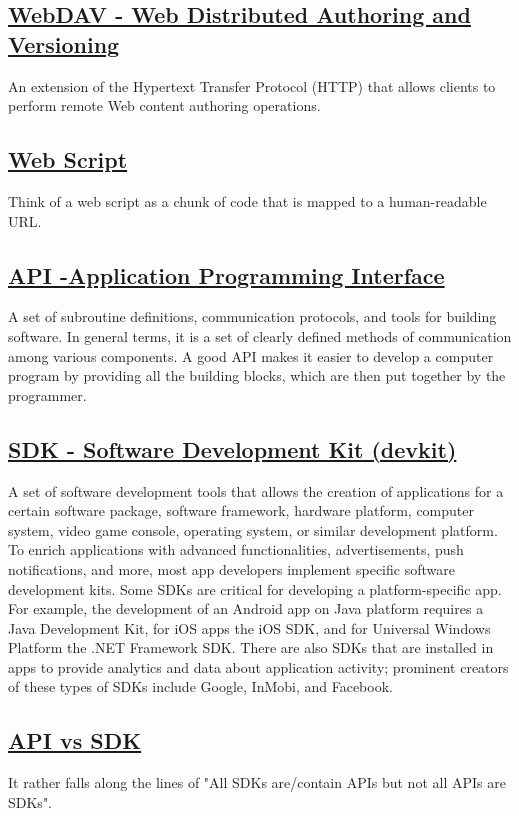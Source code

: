 \documentclass[11pt]{article}
\begin{document}
\subsection{\href{https://en.wikipedia.org/wiki/WebDAV}{WebDAV - Web Distributed Authoring and Versioning}}
\label{sec:org3872fe8}
An extension of the Hypertext Transfer Protocol (HTTP) that allows clients to perform remote Web content authoring operations.
\subsection{\href{https://ecmarchitect.com/alfresco-developer-series-tutorials/webscripts/tutorial/tutorial.html}{Web Script}}
\label{sec:orgc455295}
Think of a web script as a chunk of code that is mapped to a human-readable URL.
\subsection{\href{https://en.wikipedia.org/wiki/Application\_programming\_interface}{API -Application Programming Interface}}
\label{sec:org3449a94}
A set of subroutine definitions, communication protocols, and tools for building software. In general terms, it is a set of clearly defined methods of communication among various components. A good API makes it easier to develop a computer program by providing all the building blocks, which are then put together by the programmer.
\subsection{\href{https://en.wikipedia.org/wiki/Software\_development\_kit}{SDK - Software Development Kit (devkit)}}
\label{sec:org4bf56a3}
A set of software development tools that allows the creation of applications for a certain software package, software framework, hardware platform, computer system, video game console, operating system, or similar development platform. To enrich applications with advanced functionalities, advertisements, push notifications, and more, most app developers implement specific software development kits. Some SDKs are critical for developing a platform-specific app. For example, the development of an Android app on Java platform requires a Java Development Kit, for iOS apps the iOS SDK, and for Universal Windows Platform the .NET Framework SDK. There are also SDKs that are installed in apps to provide analytics and data about application activity; prominent creators of these types of SDKs include Google, InMobi, and Facebook.
\subsection{\href{https://softwareengineering.stackexchange.com/questions/101873/whats-the-difference-between-an-api-and-an-sdk}{API vs SDK}}
\label{sec:org4f18e52}
It rather falls along the lines of "All SDKs are/contain APIs but not all APIs are SDKs".
\end{document}
